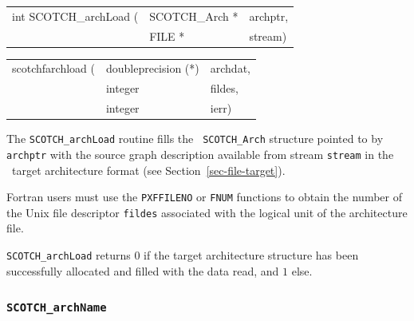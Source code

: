 \begin{itemize}
\progsyn

{\tt\begin{tabular}{l@{}ll}
int SCOTCH\_archLoad ( & SCOTCH\_Arch * & archptr, \\
                       & FILE *         & stream)
\end{tabular}}

{\tt\begin{tabular}{l@{}ll}
scotchfarchload ( & doubleprecision (*) & archdat, \\
                  & integer             & fildes,  \\
                  & integer             & ierr)
\end{tabular}}

\progdes

The {\tt SCOTCH\_archLoad} routine fills the {\tt
SCOTCH\_\lbt Arch} structure pointed to by {\tt archptr} with the
source graph description available from stream {\tt stream} in the
\scotch\ target architecture format (see
Section~\ref{sec-file-target}).

Fortran users must use the {\tt PXFFILENO} or {\tt FNUM} functions to
obtain the number of the Unix file descriptor {\tt fildes} associated
with the logical unit of the architecture file.

\progret

{\tt SCOTCH\_archLoad} returns $0$ if the target architecture structure
has been successfully allocated and filled with the data read, and $1$
else.
\end{itemize}

\subsubsection{{\tt SCOTCH\_archName}}

